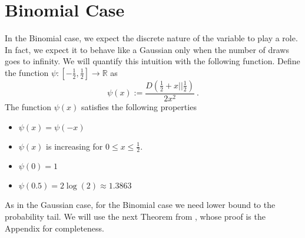 \documentclass{article}
\newcommand{\field}[1]{\mathbb{#1}}
\newcommand{\R}{\field{R}}
\begin{document}
\section{Binomial Case}
\label{section:maximum-of-random-walks}

In the Binomial case, we expect the discrete nature of the variable to play a role. In fact, we expect it to behave like a Gaussian only when the number of draws goes to infinity.
We will quantify this intuition with the following function.
Define the function $\psi:[-\frac{1}{2},\frac{1}{2}] \rightarrow \R$ as
\[
\psi(x):=\frac{D(\frac{1}{2}+x||\frac{1}{2})}{2 x^2}~.
\]
The function $\psi(x)$ satisfies the following properties
\begin{itemize}
\item $\psi(x)=\psi(-x)$
\item $\psi(x)$ is increasing for $0\leq x \leq\frac{1}{2}$.
\item $\psi(0)=1$
\item $\psi(0.5)=2 \log(2) \approx 1.3863$
\end{itemize}

As in the Gaussian case, for the Binomial case we need lower bound to the probability tail.
We will use the next Theorem from \cite{nOrabona13}, whose proof is the Appendix for completeness.
\end{document}
